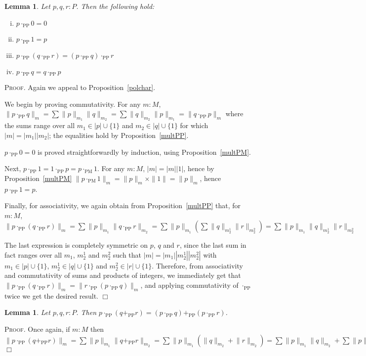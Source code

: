 \documentclass{article}
\newtheorem{lemma}[definition]{Lemma}
\newenvironment{proof}{\smallskip\textsc{Proof.}}{\hspace*{\fill}$\Box$}
\newcommand{\coeff}[2]{\ensuremath{\|#2\|_{#1}}}
\newcommand{\plusPP}{\ensuremath{+_{\mathrm{PP}}}}
\newcommand{\multPM}{\ensuremath{\cdot_{\mathrm{PM}}}}
\newcommand{\multPP}{\ensuremath{\cdot_{\mathrm{PP}}}}
\begin{document}
\begin{lemma}\label{multPPprops}
Let $p,q,r:P$.  Then the following hold:
\begin{enumerate}[(i)]
\item $p\multPP0=0$
\item $p\multPP1=p$
\item $p\multPP (q\multPP r)=(p\multPP q)\multPP r$
\item $p\multPP q=q\multPP p$
\end{enumerate}
\end{lemma}
\begin{proof} Again we appeal to Proposition~\ref{polchar}.

We begin by proving commutativity.  For any $m:M$,
$\coeff m{p\multPP q}=%
\sum\coeff{m_1}p\coeff{m_2}q=%
\sum\coeff{m_2}q\coeff{m_1}p=%
\coeff m{q\multPP p}$
where the sums range over all $m_1\in|p|\cup\{1\}$ and $m_2\in|q|\cup\{1\}$
for which $|m|=|m_1||m_2|$; the equalities hold by Proposition~\ref{multPP}.

$p\multPP0=0$ is proved straightforwardly by induction, using
Proposition~\ref{multPM}.

Next, $p\multPP1=1\multPP p=p\multPM1$.  For any $m:M$, $|m|=|m||1|$, hence
by Proposition~\ref{multPM}
$\coeff m{p\multPM1}=\coeff mp\times\|1\|=\coeff mp$, hence $p\multPP1=p$.

Finally, for associativity, we again obtain from Proposition~\ref{multPP}
that, for $m:M$,
$\coeff m{p\multPP(q\multPP r)}=%
\sum\coeff{m_1}p\coeff{m_2}{q\multPP r}=%
\sum\coeff{m_1}p\left(\sum\coeff{m_2^1}q\coeff{m_2^2}r\right)=%
\sum\coeff{m_1}p\coeff{m_2^1}q\coeff{m_2^2}r$

The last expression is completely symmetric on $p$, $q$ and $r$, since the
last sum in fact ranges over all $m_1$, $m_2^1$ and $m_2^2$ such that
$|m|=|m_1||m_2^1||m_2^2|$ with $m_1\in|p|\cup\{1\}$, $m_2^1\in|q|\cup\{1\}$
and $m_2^2\in|r|\cup\{1\}$.
Therefore, from associativity and commutativity of sums and products of
integers, we immediately get that
$\coeff m{p\multPP(q\multPP r)}=\coeff m{r\multPP(p\multPP q)}$, and
applying commutativity of {\multPP} twice we get the desired result.
\end{proof}

\begin{lemma}\label{multPPdistplusPP} Let $p,q,r:P$.  Then
$p\multPP(q\plusPP r)=(p\multPP q)\plusPP(p\multPP r)$.
\end{lemma}
\begin{proof}
Once again, if $m:M$ then
$\coeff m{p\multPP(q\plusPP r)}=%
\sum\coeff{m_1}p\coeff{m_2}{q\plusPP r}=%
\sum\coeff{m_1}p(\coeff{m_2}q+\coeff{m_2}r)=%
\sum\coeff{m_1}p\coeff{m_2}q+\sum\coeff{m_1}p\coeff{m_2}r=%
\coeff m{(p\multPP q)\plusPP(p\multPP r)}$
\end{proof}
\end{document}
